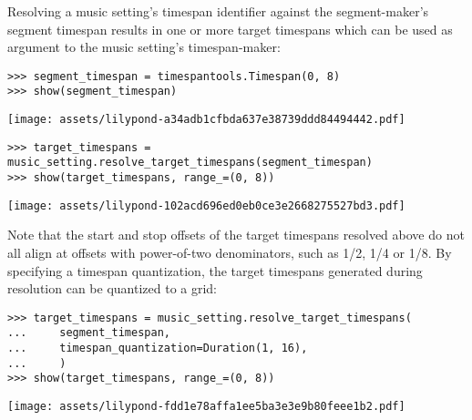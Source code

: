 \noindent Resolving a music setting's timespan identifier against the
segment-maker's segment timespan results in one or more target timespans which
can be used as argument to the music setting's timespan-maker:

\begin{comment}
<abjad>
segment_timespan = timespantools.Timespan(0, 8)
show(segment_timespan)
target_timespans = music_setting.resolve_target_timespans(segment_timespan)
show(target_timespans, range_=(0, 8))
</abjad>
\end{comment}

\begin{abjadbookoutput}
\begin{singlespacing}
\vspace{-0.5\baselineskip}
\begin{lstlisting}
>>> segment_timespan = timespantools.Timespan(0, 8)
>>> show(segment_timespan)
\end{lstlisting}
\noindent\texttt{[image: assets/lilypond-a34adb1cfbda637e38739ddd84494442.pdf]}
\begin{lstlisting}
>>> target_timespans = music_setting.resolve_target_timespans(segment_timespan)
>>> show(target_timespans, range_=(0, 8))
\end{lstlisting}
\noindent\texttt{[image: assets/lilypond-102acd696ed0eb0ce3e2668275527bd3.pdf]}
\end{singlespacing}
\end{abjadbookoutput}

\noindent Note that the start and stop offsets of the target timespans resolved
above do not all align at offsets with power-of-two denominators, such as 1/2,
1/4 or 1/8. By specifying a timespan quantization, the target timespans
generated during resolution can be quantized to a grid:

\begin{comment}
<abjad>
target_timespans = music_setting.resolve_target_timespans(
    segment_timespan,
    timespan_quantization=Duration(1, 16),
    )
show(target_timespans, range_=(0, 8))
</abjad>
\end{comment}

\begin{abjadbookoutput}
\begin{singlespacing}
\vspace{-0.5\baselineskip}
\begin{lstlisting}
>>> target_timespans = music_setting.resolve_target_timespans(
...     segment_timespan,
...     timespan_quantization=Duration(1, 16),
...     )
>>> show(target_timespans, range_=(0, 8))
\end{lstlisting}
\noindent\texttt{[image: assets/lilypond-fdd1e78affa1ee5ba3e3e9b80feee1b2.pdf]}
\end{singlespacing}
\end{abjadbookoutput}

